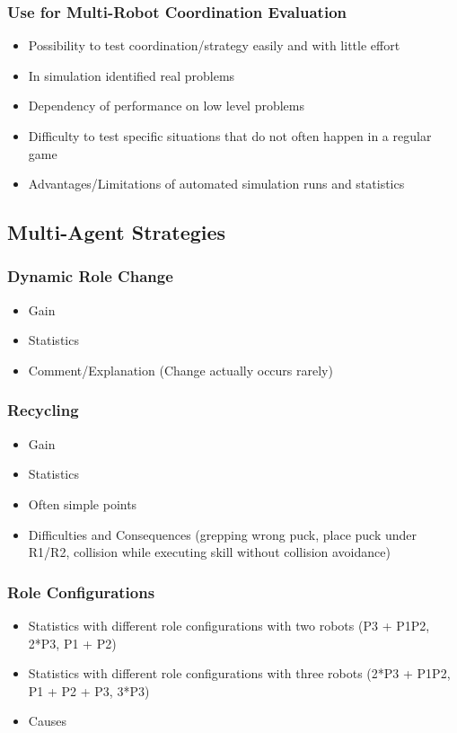 \documentclass[a4paper,11pt]{article}
\begin{document}
\subsubsection{Use for Multi-Robot Coordination Evaluation}
\begin{itemize}
\item Possibility to test coordination/strategy easily and with little effort
\item In simulation identified real problems
\item Dependency of performance on low level problems
\item Difficulty to test specific situations that do not often happen in a regular game
\item Advantages/Limitations of automated simulation runs and statistics
\end{itemize}
\subsection{Multi-Agent Strategies}
\subsubsection{Dynamic Role Change}
\begin{itemize}
\item Gain
\item Statistics
\item Comment/Explanation (Change actually occurs rarely)
\end{itemize}
\subsubsection{Recycling}
\begin{itemize}
\item Gain
\item Statistics
\item Often simple points
\item Difficulties and Consequences (grepping wrong puck, place puck under R1/R2, collision while executing skill without collision avoidance)
\end{itemize}
\subsubsection{Role Configurations}
\begin{itemize}
\item Statistics with different role configurations with two robots (P3 + P1P2, 2*P3, P1 + P2)
\item Statistics with different role configurations with three robots (2*P3 + P1P2, P1 + P2 + P3, 3*P3)
\item Causes
\end{itemize}
\end{document}
